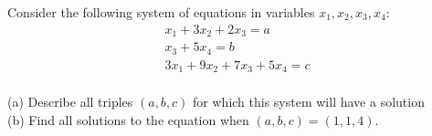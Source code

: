 \begin{question}
	\normalfont
	
	Consider the following system of equations in variables $x_1,x_2,x_3,x_4$:
	\[
	\begin{array}{r}
	x_1 + 3x_2 + 2x_3 = a \\
	x_3 + 5 x_4 = b \\
	3x_1 + 9x_2 + 7x_3 + 5x_4 = c \\
	\end{array}
	\]
	
\noindent (a) Describe all triples $(a,b,c)$ for which this system will have a solution \\
\noindent (b) Find all solutions to the equation when  $(a,b,c)=(1,1,4)$. 
	
	
\end{question}

